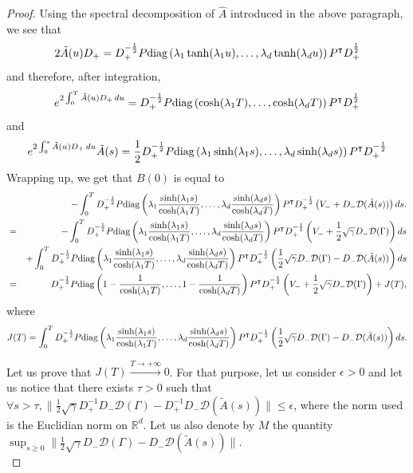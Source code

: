 \documentclass[preprint, 3p]{elsarticle}
\newcommand{\1}{{\chi}}
\begin{document}
\begin{proof}
Using the spectral decomposition of $\widehat A$ introduced in the above paragraph, we see that
$$ 2 \tilde A(u) D_+ = D_+^{-\frac 12} P \textup{diag}\left(\lambda_1 \tanh(\lambda_1 u), \ldots, \lambda_d \tanh(\lambda_d u)\right) P^\intercal D_+^{\frac 12}$$
and therefore, after integration,
$$e^{ 2 \int_0^T \tilde A(u) D_+ \,du} = D_+^{-\frac 12} P \textup{diag}\left(\cosh(\lambda_1 T), \ldots, \cosh(\lambda_d T)\right) P^\intercal D_+^{\frac 12}$$
and
$$e^{ 2 \int_0^s \tilde A(u) D_+ \,du} \tilde A(s) = \frac 12 D_+^{-\frac 12} P \textup{diag}\left(\lambda_1\sinh(\lambda_1 s), \ldots, \lambda_d\sinh(\lambda_d s)\right) P^\intercal D_+^{-\frac 12}$$
Wrapping up, we get that $B(0)$ is equal to 
\begin{eqnarray*}
&& -\int_0^T D_+^{-\frac 12} P \textup{diag}\left(\lambda_1 \frac{\sinh(\lambda_1 s)}{\cosh(\lambda_1 T)}, \ldots, \lambda_d \frac{\sinh(\lambda_d s)}{\cosh(\lambda_d T)}\right) P^\intercal D_+^{-\frac 12} \left( V_- + D_- \mathcal D(\tilde A(s)) \right) ds.\\
&=& -\int_0^T D_+^{-\frac 12} P \textup{diag}\left(\lambda_1 \frac{\sinh(\lambda_1 s)}{\cosh(\lambda_1 T)}, \ldots, \lambda_d \frac{\sinh(\lambda_d s)}{\cosh(\lambda_d T)}\right) P^\intercal D_+^{-\frac 12} \left( V_- + \frac 12 \sqrt{\gamma} D_- \mathcal D(\Gamma) \right) ds \\
&& + \int_0^T D_+^{-\frac 12} P \textup{diag}\left(\lambda_1 \frac{\sinh(\lambda_1 s)}{\cosh(\lambda_1 T)}, \ldots, \lambda_d \frac{\sinh(\lambda_d s)}{\cosh(\lambda_d T)}\right) P^\intercal D_+^{-\frac 12} \left(\frac 12 \sqrt{\gamma} D_- \mathcal D(\Gamma) - D_- \mathcal D(\tilde A(s)) \right) ds\\
&=& D_+^{-\frac 12} P \textup{diag}\left(1 - \frac{1}{\cosh(\lambda_1 T)}, \ldots, 1- \frac{1}{\cosh(\lambda_d T)}\right) P^\intercal D_+^{-\frac 12}  \left( V_- + \frac 12 \sqrt{\gamma} D_- \mathcal D(\Gamma) \right) + J(T),\\
\end{eqnarray*}
where $$J(T) = \int_0^T D_+^{-\frac 12} P \textup{diag}\left(\lambda_1 \frac{\sinh(\lambda_1 s)}{\cosh(\lambda_1 T)}, \ldots, \lambda_d \frac{\sinh(\lambda_d s)}{\cosh(\lambda_d T)}\right) P^\intercal D_+^{-\frac 12} \left(\frac 12 \sqrt{\gamma} D_- \mathcal D(\Gamma) - D_- \mathcal D(\tilde A(s)) \right) ds.$$

Let us prove that $J(T) \stackrel{T \to +\infty}{\longrightarrow} 0$. For that
purpose, let us consider $\epsilon > 0$ and let us notice that there exists
$\tau > 0$ such that $\forall s > \tau, \|\frac 12 \sqrt{\gamma} D_+^{-1} D_-
\mathcal D(\Gamma) - D_+^{-1} D_- \mathcal D(\tilde A(s))\| \le \epsilon$, where
the norm used is the Euclidian norm on $\mathbb{R}^d$. Let us also denote by $M$
the quantity $\sup_{s \ge 0} \|\frac 12 \sqrt{\gamma} D_- \mathcal D(\Gamma) -
D_- \mathcal D(\tilde A(s))\|$.\\


\end{proof}
\end{document}
